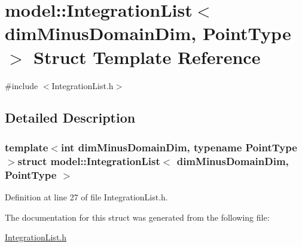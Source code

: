 \hypertarget{structmodel_1_1_integration_list}{}\section{model\+:\+:Integration\+List$<$ dim\+Minus\+Domain\+Dim, Point\+Type $>$ Struct Template Reference}
\label{structmodel_1_1_integration_list}


{\ttfamily \#include $<$Integration\+List.\+h$>$}



\subsection{Detailed Description}
\subsubsection*{template$<$int dim\+Minus\+Domain\+Dim, typename Point\+Type$>$struct model\+::\+Integration\+List$<$ dim\+Minus\+Domain\+Dim, Point\+Type $>$}



Definition at line 27 of file Integration\+List.\+h.



The documentation for this struct was generated from the following file\+:\begin{DoxyCompactItemize}
\item 
\hyperlink{_integration_list_8h}{Integration\+List.\+h}\end{DoxyCompactItemize}
